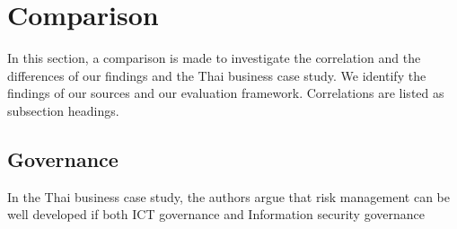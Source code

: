 
\section{Comparison}

In this section, a comparison is made to investigate the correlation and the differences of our findings and the Thai business case study. We identify the findings of our sources and our evaluation framework. Correlations are listed as subsection headings.

\subsection{Governance}

In the Thai business case study, the authors argue that risk management can be well developed if both ICT governance and Information security governance